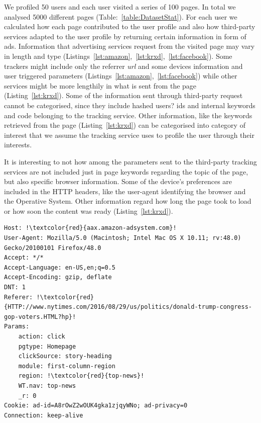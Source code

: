 We profiled 50 users and each user visited a series of 100 pages. In total we analysed 5000 different pages (Table:~\ref{table:DatasetStat}). For each user we calculated how each page contributed to the user profile and also how third-party services adapted to the user profile by returning certain information in form of ads. Information that advertising services request from the visited page may vary in length and type (Listings~\ref{lst:amazon},~\ref{lst:krxd},~\ref{lst:facebook}). Some trackers might include only the referrer \emph{url} and some devices information and user triggered parameters (Listings~\ref{lst:amazon},~\ref{lst:facebook}) while other services might be more lengthily in what is sent from the page (Listing~\ref{lst:krxd}). Some of the information sent through third-party request cannot be categorised, since they include hashed users? ids and internal keywords and code belonging to the tracking service. Other information, like the keywords retrieved from the page (Listing~\ref{lst:krxd}) can be categorised into category of interest that we assume the tracking service uses to profile the user through their interests.

It is interesting to not how among the parameters sent to the third-party tracking services are not included just in page keywords regarding the topic of the page, but also specific browser information. Some of the device's preferences are included in the HTTP headers, like the user-agent identifying the browser and the Operative System. Other information regard how long the page took to load or how soon the content was ready (Listing~\ref{lst:krxd}).

\begin{lstlisting}[frame=single, breaklines=true, keepspaces=true, basicstyle=\tiny, escapechar=!]
Host: !\textcolor{red}{aax.amazon-adsystem.com}!
User-Agent: Mozilla/5.0 (Macintosh; Intel Mac OS X 10.11; rv:48.0)
Gecko/20100101 Firefox/48.0
Accept: */*
Accept-Language: en-US,en;q=0.5
Accept-Encoding: gzip, deflate
DNT: 1
Referer: !\textcolor{red}{HTTP://www.nytimes.com/2016/08/29/us/politics/donald-trump-congress-gop-voters.HTML?hp}!
Params:
	action: click
	pgtype: Homepage
	clickSource: story-heading
	module: first-column-region
	region: !\textcolor{red}{top-news}!
	WT.nav: top-news
	_r: 0
Cookie: ad-id=A8rOwZ2wOUK4gka1zjqyWNo; ad-privacy=0
Connection: keep-alive
\end{lstlisting}

